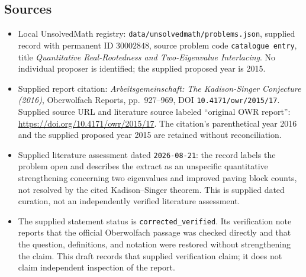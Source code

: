 \documentclass[11pt]{article}
\begin{document}
\subsection{Sources}
\begin{itemize}
\item Local UnsolvedMath registry: \texttt{data/unsolvedmath/problems.json}, supplied record with permanent ID \(30002848\), source problem code \texttt{catalogue entry}, title \emph{Quantitative Real-Rootedness and Two-Eigenvalue Interlacing}. No individual proposer is identified; the supplied proposed year is 2015.
\item Supplied report citation: \emph{Arbeitsgemeinschaft: The Kadison-Singer Conjecture (2016)}, Oberwolfach Reports, pp.~927--969, DOI \texttt{10.4171/owr/2015/17}. Supplied source URL and literature source labeled ``original OWR report'': \url{https://doi.org/10.4171/owr/2015/17}. The citation's parenthetical year 2016 and the supplied proposed year 2015 are retained without reconciliation.
\item Supplied literature assessment dated \texttt{2026-08-21}: the record labels the problem open and describes the extract as an unspecific quantitative strengthening concerning two eigenvalues and improved paving block counts, not resolved by the cited Kadison--Singer theorem. This is supplied dated curation, not an independently verified literature assessment.
\item The supplied statement status is \texttt{corrected\_verified}. Its verification note reports that the official Oberwolfach passage was checked directly and that the question, definitions, and notation were restored without strengthening the claim. This draft records that supplied verification claim; it does not claim independent inspection of the report.
\end{itemize}
\end{document}

